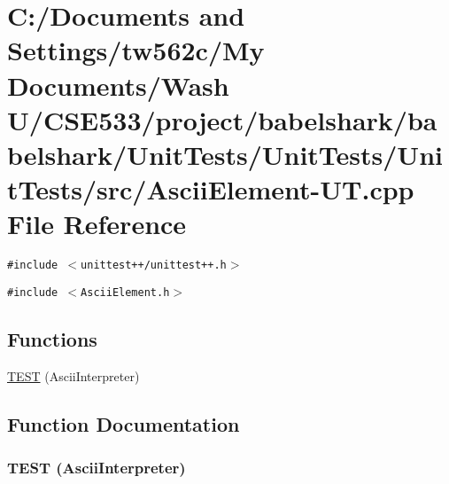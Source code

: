 \hypertarget{_ascii_element-_u_t_8cpp}{
\section{C:/Documents and Settings/tw562c/My Documents/Wash U/CSE533/project/babelshark/babelshark/UnitTests/UnitTests/UnitTests/src/AsciiElement-UT.cpp File Reference}
\label{_ascii_element-_u_t_8cpp}
}
{\tt \#include $<$unittest++/unittest++.h$>$}\par
{\tt \#include $<$AsciiElement.h$>$}\par
\subsection*{Functions}
\begin{CompactItemize}
\item 
\hyperlink{_ascii_element-_u_t_8cpp_0bbaf7e49f07fa3dc836ea177598c039}{TEST} (AsciiInterpreter)
\end{CompactItemize}


\subsection{Function Documentation}
\hypertarget{_ascii_element-_u_t_8cpp_0bbaf7e49f07fa3dc836ea177598c039}{
\subsubsection[{TEST}]{\setlength{\rightskip}{0pt plus 5cm}TEST (AsciiInterpreter)}}
\label{_ascii_element-_u_t_8cpp_0bbaf7e49f07fa3dc836ea177598c039}



